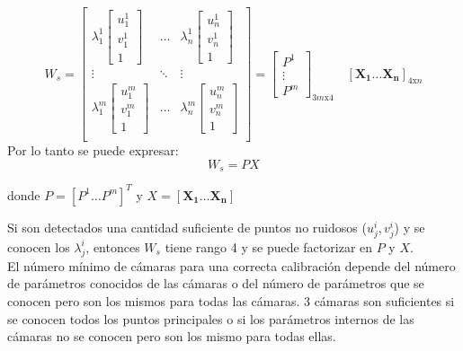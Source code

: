 \[
W_s =
\begin{bmatrix}

	\lambda_1^1
	\begin{bmatrix}
	u_1^1 \\
	v_1^1 \\
	1
	\end{bmatrix} &
	
	\ldots &
	
	\lambda_n^1
	\begin{bmatrix}
	u_n^1 \\
	v_n^1 \\
	1
	\end{bmatrix} \\
	
	\vdots & \ddots & \vdots \\
	
	
	\lambda_1^m
	\begin{bmatrix}
	u_1^m \\
	v_1^m \\
	1
	\end{bmatrix} &
	
	\ldots &
	
	\lambda_n^m
	\begin{bmatrix}
	u_n^m \\
	v_n^m \\
	1
	\end{bmatrix} \\

\end{bmatrix}
= 
\begin{bmatrix}
P^1 \\
\vdots \\
P^m
\end{bmatrix}_{3m\text{x}4}
\quad
[\mathbf{X_1} \ldots \mathbf{X_n}]_{4\text{x}n}
\]
Por lo tanto se puede expresar:
\[ W_s = PX\]

donde $P = [P^1 \ldots P^m]^T$ y $X = [\mathbf{X_1} \ldots \mathbf{X_n}]$

Si son detectados una cantidad suficiente de puntos no ruidosos ($u_j^i, v_j^i$) y se conocen los $\lambda_j^i$, entonces $W_s$ tiene rango 4  y se puede factorizar en $P$ y $X$.\\

El número mínimo de cámaras para una correcta calibración depende del número de parámetros conocidos de las cámaras o del número de parámetros que se conocen pero son los mismos para todas las cámaras. 3 cámaras son suficientes si se conocen todos los puntos principales o si los parámetros internos de las cámaras no se conocen pero son los mismo para todas ellas.\\

